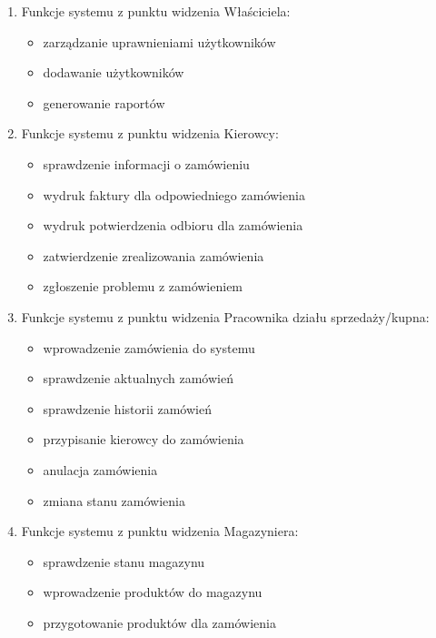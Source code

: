 
\begin{enumerate}
\item Funkcje systemu z punktu widzenia Właściciela:
	\begin{itemize}
		\item zarządzanie uprawnieniami użytkowników
		\item dodawanie użytkowników
		\item generowanie raportów
	\end{itemize}

\item Funkcje systemu z punktu widzenia Kierowcy:
	\begin{itemize}
		\item sprawdzenie informacji o zamówieniu
		\item wydruk faktury dla odpowiedniego zamówienia
		\item wydruk potwierdzenia odbioru dla zamówienia
		\item zatwierdzenie zrealizowania zamówienia
		\item zgłoszenie problemu z zamówieniem
	\end{itemize}

\item Funkcje systemu z punktu widzenia Pracownika działu sprzedaży/kupna:
	\begin{itemize}
		\item wprowadzenie zamówienia do systemu
		\item sprawdzenie aktualnych zamówień
		\item sprawdzenie historii zamówień
		\item przypisanie kierowcy do zamówienia
		\item anulacja zamówienia
		\item zmiana stanu zamówienia
	\end{itemize}

\item Funkcje systemu z punktu widzenia Magazyniera:
	\begin{itemize}
		\item sprawdzenie stanu magazynu 
		\item wprowadzenie produktów do magazynu
		\item przygotowanie produktów dla zamówienia
	\end{itemize}
\end{enumerate}